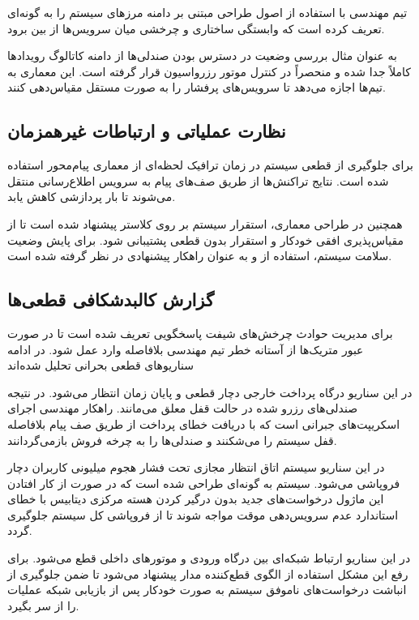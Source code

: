 \documentclass{article}
\begin{document}
تیم مهندسی با استفاده از اصول طراحی مبتنی بر دامنه  مرزهای سیستم  را به گونه‌ای تعریف کرده است که وابستگی ساختاری و چرخشی میان سرویس‌ها از بین برود. 

به عنوان مثال بررسی وضعیت در دسترس بودن صندلی‌ها از دامنه کاتالوگ رویدادها کاملاً جدا شده و منحصراً در کنترل موتور رزرواسیون قرار گرفته است. این معماری به تیم‌ها اجازه می‌دهد تا سرویس‌های پرفشار را به صورت مستقل مقیاس‌دهی کنند.

\subsection{نظارت عملیاتی و ارتباطات غیرهمزمان}

برای جلوگیری از قطعی سیستم در زمان ترافیک لحظه‌ای از معماری پیام‌محور  استفاده شده است. نتایج تراکنش‌ها از طریق صف‌های پیام به سرویس اطلاع‌رسانی منتقل می‌شوند تا بار پردازشی کاهش یابد.

همچنین در طراحی معماری، استقرار سیستم بر روی کلاستر  پیشنهاد شده است تا از مقیاس‌پذیری افقی خودکار  و استقرار بدون قطعی  پشتیبانی شود. برای پایش وضعیت سلامت سیستم، استفاده از  و  به عنوان راهکار پیشنهادی در نظر گرفته شده است.
\subsection{گزارش کالبدشکافی قطعی‌ها }

برای مدیریت حوادث چرخش‌های شیفت پاسخگویی  تعریف شده است تا در صورت عبور متریک‌ها از آستانه خطر تیم مهندسی بلافاصله وارد عمل شود. در ادامه سناریوهای قطعی بحرانی تحلیل شده‌اند

\begin{description}[font=$\bullet$~\normalsize\scshape]
\item {} در این سناریو درگاه پرداخت خارجی دچار قطعی و پایان زمان انتظار  می‌شود. در نتیجه صندلی‌های رزرو شده در حالت قفل معلق می‌مانند. راهکار مهندسی اجرای اسکریپت‌های جبرانی  است که با دریافت خطای پرداخت از طریق صف پیام بلافاصله قفل سیستم  را می‌شکنند و صندلی‌ها را به چرخه فروش بازمی‌گردانند.
\item {} در این سناریو سیستم اتاق انتظار مجازی تحت فشار هجوم میلیونی کاربران دچار فروپاشی می‌شود. سیستم به گونه‌ای طراحی شده است که در صورت از کار افتادن این ماژول درخواست‌های جدید بدون درگیر کردن هسته مرکزی دیتابیس با خطای استاندارد عدم سرویس‌دهی موقت  مواجه شوند تا از فروپاشی کل سیستم جلوگیری گردد.
\item {} در این سناریو ارتباط شبکه‌ای بین درگاه ورودی  و موتورهای داخلی قطع می‌شود. برای رفع این مشکل استفاده از الگوی قطع‌کننده مدار  پیشنهاد می‌شود تا ضمن جلوگیری از انباشت درخواست‌های ناموفق سیستم به صورت خودکار پس از بازیابی شبکه عملیات را از سر بگیرد.\end{description}
\end{document}
